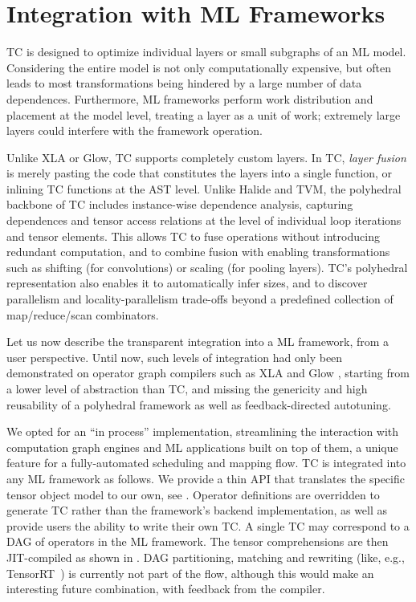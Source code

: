 \section{Integration with ML Frameworks}
TC is designed to optimize individual layers or small subgraphs of an ML model.
Considering the entire model is not only computationally expensive, but often
leads to most transformations being hindered by a large number of data
dependences. Furthermore, ML frameworks perform work distribution and placement
at the model level, treating a layer as a unit of work; extremely large layers
could interfere with the framework operation.

Unlike XLA or Glow, TC supports completely custom layers.  In TC,
\emph{layer fusion} is merely pasting the code that constitutes the
layers into a single function, or inlining TC functions at the AST
level. Unlike Halide and TVM, the polyhedral backbone of TC includes
instance-wise dependence analysis, capturing dependences and tensor
access relations at the level of individual loop iterations and tensor
elements. This allows TC to fuse operations without introducing
redundant computation, and to combine fusion with enabling
transformations such as shifting (for convolutions) or
scaling (for pooling layers). TC's polyhedral representation also
enables it to automatically infer sizes, and to discover parallelism and
locality-parallelism trade-offs beyond a predefined collection of
map/reduce/scan combinators.

Let us now describe the transparent integration into a ML framework,
from a user perspective.  Until now, such levels of integration had
only been demonstrated on operator graph compilers such as XLA \cite{XLA}
and Glow \cite{Glow}, starting from a lower level of abstraction than TC,
and missing the genericity and high reusability of a polyhedral
framework as well as feedback-directed autotuning.

We opted for an ``in process'' implementation, streamlining the interaction
with computation graph engines and ML applications built on top of them, a
unique feature for a fully-automated scheduling and mapping flow.
TC is integrated into any ML framework as follows.  We provide a thin API that
translates the specific tensor object model to our own, see
. Operator definitions are overridden to generate TC rather
than the framework's backend implementation, as well as provide users the
ability to write their own TC.  A single TC may correspond to a DAG of
operators in the ML framework.
The tensor comprehensions are then JIT-compiled as shown in .
DAG partitioning, matching and rewriting (like, e.g.,
TensorRT~\cite{TensorRT}) is currently not part of the flow, although
this would make an interesting future combination,
with feedback from the compiler.

